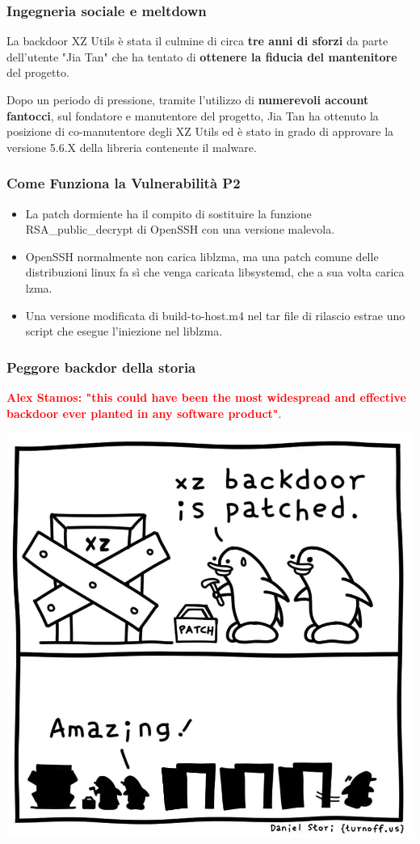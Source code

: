 \begin{frame}
\frametitle{Ingegneria sociale e meltdown}
La backdoor XZ Utils è stata il culmine di circa \textbf{tre anni di sforzi} da parte dell'utente "Jia Tan" che ha tentato di \textbf{ottenere la fiducia del mantenitore} del progetto.

\vspace{0.5 cm}

Dopo un periodo di pressione, tramite l'utilizzo di \textbf{numerevoli account fantocci}, sul fondatore e manutentore del progetto, Jia Tan ha ottenuto la posizione di co-manutentore degli XZ Utils ed è stato in grado di approvare la versione 5.6.X della libreria contenente il malware.

\end{frame}

\begin{frame}
    \frametitle{Come Funziona la Vulnerabilità P2}
    \begin{itemize}
        \item La patch dormiente ha il compito di sostituire la funzione RSA\_public\_decrypt di OpenSSH con una versione malevola.
        \item OpenSSH normalmente non carica liblzma, ma una patch comune delle distribuzioni linux fa sì che venga caricata libsystemd, che a sua volta carica lzma.
        \item Una versione modificata di build-to-host.m4 nel tar file di rilascio estrae uno script che esegue l'iniezione nel liblzma.
    \end{itemize}
\end{frame}

\begin{frame}
    \frametitle{Peggore backdor della storia}
    \textbf{\textcolor{red}{Alex Stamos: "this could have been the most widespread and effective backdoor ever planted in any software product"}}.

    \begin{center}
        \includegraphics[width=0.4\linewidth]{img/2-Introduction/xz-backdoor-patched.jpeg}
    \end{center}
\vspace{0.5 cm}

\end{frame}